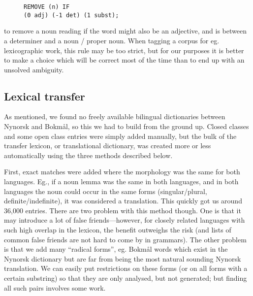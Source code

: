\documentclass[11pt]{article}
\begin{document}
\begin{figure}[htp] {\tt REMOVE (n) IF\\
    (0 adj) (-1 det) (1 subst);}
\end{figure}

to remove a noun reading if the word might also be an adjective,
and is between a determiner and a noun / proper noun. When tagging a
corpus for eg. lexicographic work, this rule may be too strict, but
for our purposes it is better to make a choice which will be correct
most of the time than to end up with an unsolved ambiguity.

\subsection{Lexical transfer}

As mentioned, we found no freely available bilingual dictionaries
between Nynorsk and Bokmål, so this we had to build from the ground
up. Closed classes and some open class entries were simply added
manually, but the bulk of the transfer lexicon, or translational
dictionary, was created more or less automatically using the three
methods described below.

First, exact matches were added where the morphology was the same for
both languages. Eg., if a noun lemma was the same in both languages,
and in both languages the noun could occur in the same forms
(singular/plural, definite/indefinite), it was considered a
translation. This quickly got us around 36,000 entries. There are two
problem with this method though. One is that it may introduce a lot of
false friends—however, for closely related languages with such high
overlap in the lexicon, the benefit outweighs the risk (and lists of
common false friends are not hard to come by in grammars). The other
problem is that we add many ``radical forms'', eg. Bokmål words which
exist in the Nynorsk dictionary but are far from being the most
natural sounding Nynorsk translation. We can easily put restrictions
on these forms (or on all forms with a certain substring) so that they
are only analysed, but not generated; but finding all such pairs
involves some work.
\end{document}
